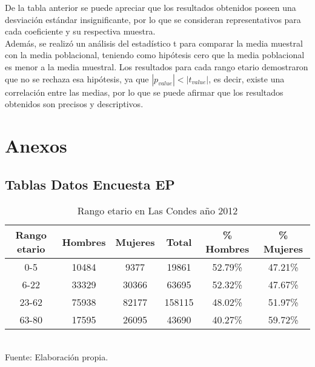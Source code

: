 \documentclass[12pt]{article} %
\begin{document}
De la tabla anterior se puede apreciar que los resultados obtenidos poseen una desviación estándar insignificante, por lo que se 
consideran representativos para cada coeficiente y su respectiva muestra.\\

Además, se realizó un análisis del estadístico t para 
comparar la media muestral con la media poblacional, teniendo como hipótesis cero que la media poblacional es menor a la media muestral.
Los resultados para cada rango etario demostraron que no se rechaza esa hipótesis, ya que \(\left| p_{value} \right| < \left| t_{value} \right|\), es decir, existe una correlación entre las medias, 
por lo que se puede afirmar que los resultados obtenidos son precisos y descriptivos.


\section{Anexos}

\subsection{Tablas Datos Encuesta EP}

\begin{table}[H]
    \centering
    \caption{Rango etario en Las Condes año 2012}
    \vspace{0.2cm}
    \begin{tabular}{|c|c|c|c|c|c|}
        \hline
        \textbf{Rango etario} & \textbf{Hombres} & \textbf{Mujeres} & \textbf{Total} & \textbf{\% Hombres} & \textbf{\% Mujeres} \\ \hline
        0-5 & 10484 & 9377 & 19861 & 52.79\% & 47.21\% \\ \hline
        6-22 & 33329 & 30366 & 63695 & 52.32\% & 47.67\% \\ \hline
        23-62 & 75938 & 82177 & 158115 & 48.02\% & 51.97\% \\ \hline
        63-80 & 17595 & 26095 & 43690 & 40.27\% & 59.72\% \\ \hline
    \end{tabular}
    \label{Cuadro 4}
    \vspace{0.2cm}
    \\Fuente: Elaboración propia.
\end{table}
\end{document}
